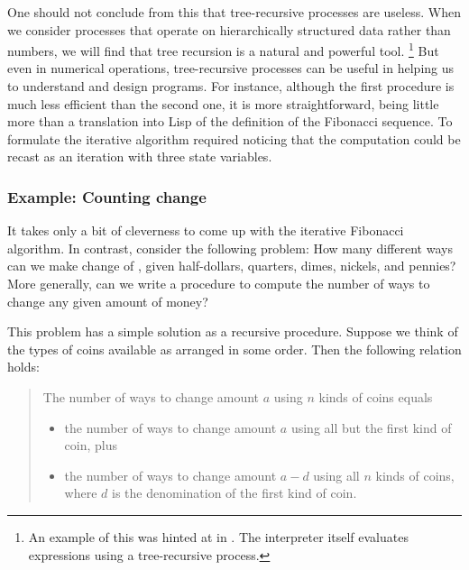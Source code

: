 One should not conclude from this that tree-recursive processes are useless.
When we consider processes that operate on hierarchically structured data rather than numbers, we will find that tree recursion is a natural and powerful tool.%
\footnote{
	An example of this was hinted at in .
	The interpreter itself evaluates expressions using a tree-recursive process.
}
But even in numerical operations, tree-recursive processes can be useful in helping us to understand and design programs.
For instance, although the first  procedure is much less efficient than the second one, it is more straightforward, being little more than a translation into Lisp of the definition of the Fibonacci sequence.
To formulate the iterative algorithm required noticing that the computation could be recast as an iteration with three state variables.



\subsubsection*{Example: Counting change}

It takes only a bit of cleverness to come up with the iterative Fibonacci algorithm.
In contrast, consider the following problem:
How many different ways can we make change of , given half-dollars, quarters, dimes, nickels, and pennies?
More generally, can we write a procedure to compute the number of ways to change any given amount of money?

This problem has a simple solution as a recursive procedure.
Suppose we think of the types of coins available as arranged in some order.
Then the following relation holds:

\begin{quote}
	The number of ways to change amount \( a \) using \( n \) kinds of coins equals
	\begin{itemize}[leftmargin = *]

		\item
			the number of ways to change amount \( a \) using all but the first kind of coin, plus

		\item
			the number of ways to change amount \( a - d \) using all \( n \) kinds of coins, where \( d \) is the denomination of the first kind of coin.

	\end{itemize}
\end{quote}

